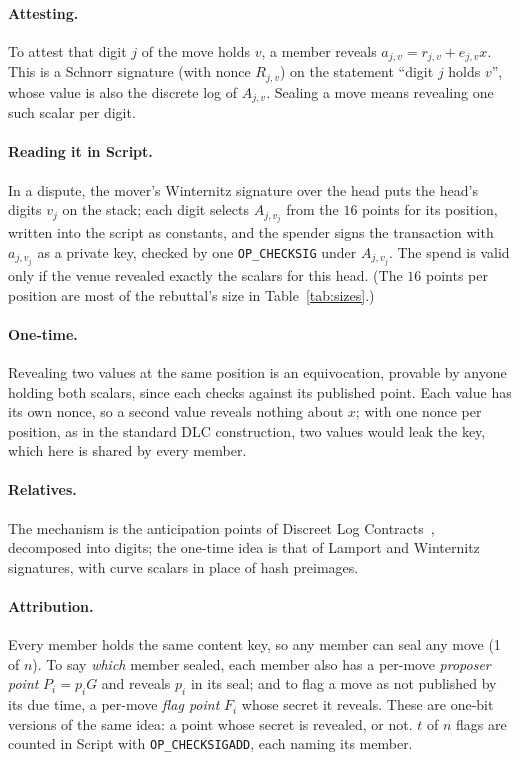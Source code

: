\documentclass[11pt]{article}
\newcommand{\op}[1]{\texttt{OP\_#1}}
\begin{document}
\paragraph{Attesting.} To attest that digit $j$ of the move holds $v$, a member reveals $a_{j,v} = r_{j,v} + e_{j,v}x$. This is a Schnorr signature (with nonce $R_{j,v}$) on the statement ``digit $j$ holds $v$'', whose value is also the discrete log of $A_{j,v}$. Sealing a move means revealing one such scalar per digit.

\paragraph{Reading it in Script.} In a dispute, the mover's Winternitz signature over the head puts the head's digits $v_j$ on the stack; each digit selects $A_{j,v_j}$ from the $16$ points for its position, written into the script as constants, and the spender signs the transaction with $a_{j,v_j}$ as a private key, checked by one \op{CHECKSIG} under $A_{j,v_j}$. The spend is valid only if the venue revealed exactly the scalars for this head. (The $16$ points per position are most of the rebuttal's size in Table~\ref{tab:sizes}.)

\paragraph{One-time.} Revealing two values at the same position is an equivocation, provable by anyone holding both scalars, since each checks against its published point. Each value has its own nonce, so a second value reveals nothing about $x$; with one nonce per position, as in the standard DLC construction, two values would leak the key, which here is shared by every member.

\paragraph{Relatives.} The mechanism is the anticipation points of Discreet Log Contracts~\cite{dlc}, decomposed into digits; the one-time idea is that of Lamport and Winternitz signatures, with curve scalars in place of hash preimages.

\paragraph{Attribution.} Every member holds the same content key, so any member can seal any move (1 of $n$). To say \emph{which} member sealed, each member also has a per-move \emph{proposer point} $P_i = p_iG$ and reveals $p_i$ in its seal; and to flag a move as not published by its due time, a per-move \emph{flag point} $F_i$ whose secret it reveals. These are one-bit versions of the same idea: a point whose secret is revealed, or not. $t$ of $n$ flags are counted in Script with \op{CHECKSIGADD}, each naming its member.
\end{document}
